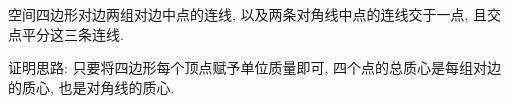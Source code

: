 空间四边形对边两组对边中点的连线, 以及两条对角线中点的连线交于一点, 且交点平分这三条连线. 

证明思路: 只要将四边形每个顶点赋予单位质量即可, 四个点的总质心是每组对边的质心, 也是对角线的质心.


\newpage





































